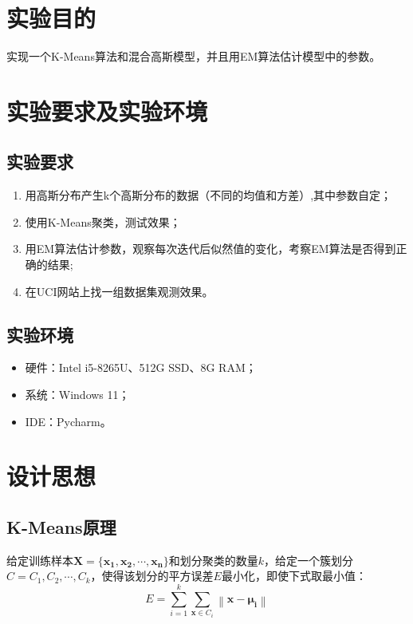 \documentclass[withoutpreface,bwprint]{cumcmthesis}
\begin{document}
\section{实验目的}
实现一个K-Means算法和混合高斯模型，并且用EM算法估计模型中的参数。

\section{实验要求及实验环境}
\subsection{实验要求}
\begin{enumerate}
\setlength{\itemindent}{1.5em}
\item 用高斯分布产生k个高斯分布的数据（不同的均值和方差）,其中参数自定；
\item 使用K-Means聚类，测试效果；
\item 用EM算法估计参数，观察每次迭代后似然值的变化，考察EM算法是否得到正确的结果;
\item 在UCI网站上找一组数据集观测效果。
\end{enumerate}

\subsection{实验环境}
\begin{itemize}
\setlength{\itemindent}{1.5em}
\item 硬件：Intel i5-8265U、512G SSD、8G RAM；
\item 系统：Windows 11；
\item IDE：Pycharm。
\end{itemize}

\section{设计思想}
\subsection{K-Means原理}
给定训练样本$\boldsymbol{X}=\{\boldsymbol{x_{1}},\boldsymbol{x_{2}},\cdots,\boldsymbol{x_{n}}\}$和划分聚类的数量$k$，给定一个簇划分$C=C_{1},C_{2},\cdots,C_{k}$，使得该划分的平方误差$E$最小化，即使下式取最小值：
\begin{equation*}
E=\sum_{i=1}^{k}\sum_{\boldsymbol{x}\in C_{i}}\left \| \boldsymbol{x}-\boldsymbol{\mu_{i}} \right \|
\end{equation*}
\end{document}
